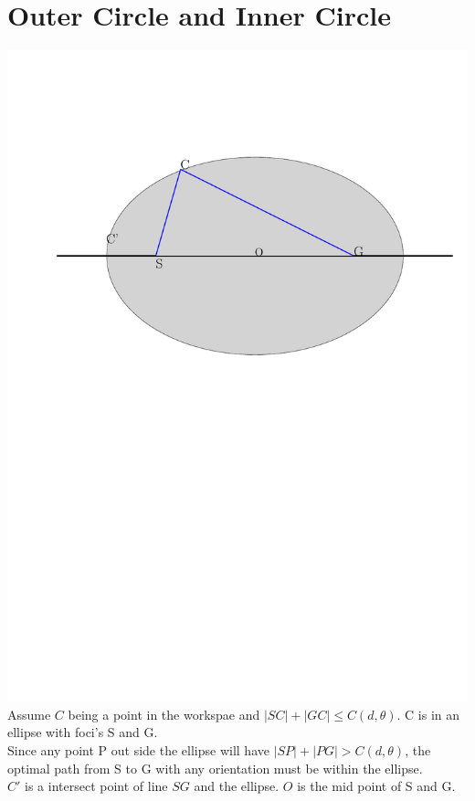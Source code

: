 \documentclass[12pt]{article}
\begin{document}
  \section{Outer Circle and Inner Circle}
  \includegraphics[scale=0.7]{Ellipse}\\

  Assume $C$ being a point in the workspae and $|SC|+|GC| \leq C( d, \theta )$. C is in an ellipse with foci's S and G. \\ 
  
  Since any point P out side the ellipse will have $|SP| + |PG| > C( d, \theta )$, the optimal path from S to G with any orientation must be within the ellipse.\\
  
  $C'$ is a intersect point of line $SG$ and the ellipse. $O$ is the mid point of S and G. \\
  
\end{document}
